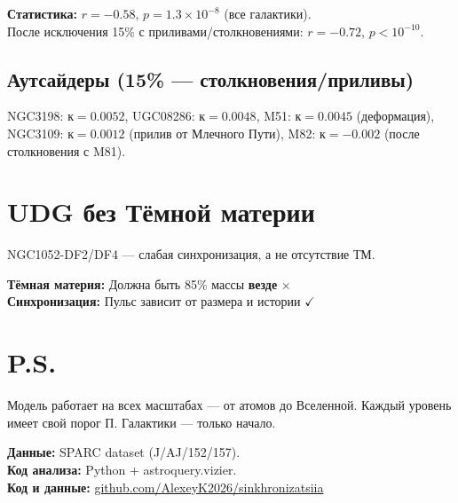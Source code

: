\documentclass[12pt]{article}
\begin{document}
\textbf{Статистика:} $r = -0.58$, $p = 1.3\times10^{-8}$ (все галактики). \\
После исключения 15\% с приливами/столкновениями: $r = -0.72$, $p < 10^{-10}$.

\subsection{Аутсайдеры (15\% — столкновения/приливы)}
\vspace{-0.2cm}
NGC3198: $\text{к}=0.0052$, UGC08286: $\text{к}=0.0048$, M51: $\text{к}=0.0045$ (деформация), NGC3109: $\text{к}=0.0012$ (прилив от Млечного Пути), M82: $\text{к}=-0.002$ (после столкновения с M81).

\section{UDG без Тёмной материи}
\vspace{-0.2cm}
NGC1052-DF2/DF4 — слабая синхронизация, а не отсутствие ТМ.

\textbf{Тёмная материя:} Должна быть 85\% массы \textbf{везде} $\times$ \\
\textbf{Синхронизация:} Пульс зависит от размера и истории $\checkmark$

\section*{P.S.}
\vspace{-0.3cm}
Модель работает на всех масштабах — от атомов до Вселенной. Каждый уровень имеет свой порог $\text{П}$. Галактики — только начало.

\vspace{0.3cm}
\small
\textbf{Данные:} SPARC dataset (J/AJ/152/157). \\
\textbf{Код анализа:} Python + astroquery.vizier. \\
\textbf{Код и данные:} \href{https://github.com/AlexeyK2026/sinkhronizatsiia}{github.com/AlexeyK2026/sinkhronizatsiia}
\end{document}
